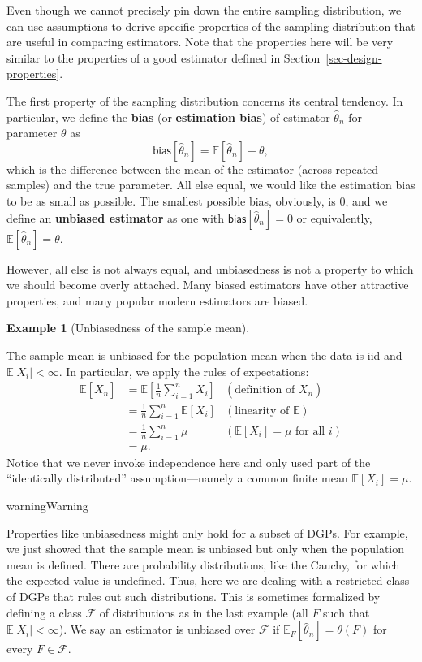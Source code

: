 \documentclass[
  13pt,
  letterpaper,
  DIV=11,
  numbers=noendperiod]{scrreprt}
\newcommand{\E}{\mathbb{E}}
\newcommand{\Xbar}{\overline{X}}
\theoremstyle{plain}
\theoremstyle{plain}
\theoremstyle{definition}
\theoremstyle{definition}
\newtheorem{example}{Example}[chapter]
\theoremstyle{remark}
\begin{document}
Even though we cannot precisely pin down the entire sampling
distribution, we can use assumptions to derive specific properties of
the sampling distribution that are useful in comparing estimators. Note
that the properties here will be very similar to the properties of a
good estimator defined in Section~\ref{sec-design-properties}.

The first property of the sampling distribution concerns its central
tendency. In particular, we define the \textbf{bias} (or
\textbf{estimation bias}) of estimator \(\widehat{\theta}_n\) for
parameter \(\theta\) as \[
\textsf{bias}[\widehat{\theta}_n] = \E[\widehat{\theta}_n] - \theta,
\] which is the difference between the mean of the estimator (across
repeated samples) and the true parameter. All else equal, we would like
the estimation bias to be as small as possible. The smallest possible
bias, obviously, is 0, and we define an \textbf{unbiased estimator} as
one with \(\textsf{bias}[\widehat{\theta}_n] = 0\) or equivalently,
\(\E[\widehat{\theta}_n] = \theta\).

However, all else is not always equal, and unbiasedness is not a
property to which we should become overly attached. Many biased
estimators have other attractive properties, and many popular modern
estimators are biased.

\begin{example}[Unbiasedness of the sample
mean]\protect\hypertarget{exm-mean-unbiased}{}\label{exm-mean-unbiased}

The sample mean is unbiased for the population mean when the data is iid
and \(\E|X_i| < \infty\). In particular, we apply the rules of
expectations: \[\begin{aligned}
\E\left[ \Xbar_n \right] &= \E\left[\frac{1}{n} \sum_{i=1}^n X_i\right] & (\text{definition of } \Xbar_n) \\
&= \frac{1}{n} \sum_{i=1}^n \E[X_i] & (\text{linearity of } \E)\\
&= \frac{1}{n} \sum_{i=1}^n \mu & (\E[X_i] = \mu \text{ for all }i)\\
&= \mu.
\end{aligned}\] Notice that we never invoke independence here and only
used part of the ``identically distributed'' assumption---namely a
common finite mean \(\E[X_i] = \mu\).

\end{example}

\begin{bookcallout}{warning}{Warning}

Properties like unbiasedness might only hold for a subset of DGPs. For
example, we just showed that the sample mean is unbiased but only when
the population mean is defined. There are probability distributions,
like the Cauchy, for which the expected value is undefined. Thus, here
we are dealing with a restricted class of DGPs that rules out such
distributions. This is sometimes formalized by defining a class
\(\mathcal{F}\) of distributions as in the last example (all \(F\) such
that \(\E|X_i| < \infty\)). We say an estimator is unbiased over
\(\mathcal F\) if \(\E_F[\widehat\theta_n]=\theta(F)\) for every
\(F\in\mathcal F\).

\end{bookcallout}
\end{document}
